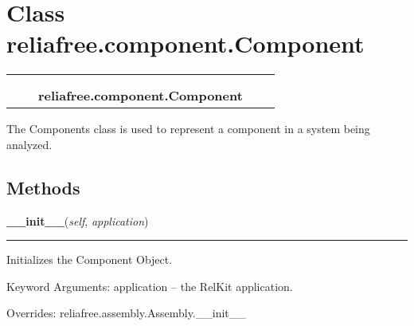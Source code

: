 %
%
%


\section{Class reliafree.component.Component}

    \label{reliafree:component:Component}
\begin{tabular}{cccccc}
\multicolumn{2}{r}{\settowidth{\BCL}{reliafree.assembly.Assembly}\multirow{2}{\BCL}{reliafree.assembly.Assembly}}
&&
  \\\cline{3-3}
  &&\multicolumn{1}{c|}{}
&&
  \\
&&\multicolumn{2}{l}{\textbf{reliafree.component.Component}}
\end{tabular}

The Components class is used to represent a component in a system being 
analyzed.



  \subsection{Methods}

    \vspace{0.5ex}

\hspace{.8\funcindent}\begin{boxedminipage}{\funcwidth}

    \raggedright \textbf{\_\_init\_\_}(\textit{self}, \textit{application})

    \vspace{-1.5ex}

    \rule{\textwidth}{0.5\fboxrule}
\setlength{\parskip}{2ex}
    Initializes the Component Object.

    Keyword Arguments: application -- the RelKit application.

\setlength{\parskip}{1ex}
      Overrides: reliafree.assembly.Assembly.\_\_init\_\_

    \end{boxedminipage}

